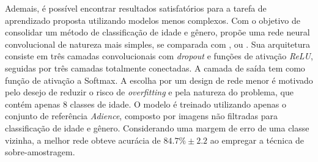 Ademais, é possível encontrar resultados satisfatórios para a tarefa de aprendizado proposta utilizando modelos menos complexos. Com o objetivo de consolidar um método de classificação de idade e gênero, \cite{levi2015age} propõe uma rede neural convolucional de natureza mais simples, se comparada com \cite{inception}, \cite{vggnet} ou \cite{resnet}. Sua arquitetura consiste em três camadas convolucionais com \emph{dropout} e funções de ativação \emph{ReLU}, seguidas por três camadas totalmente conectadas. A camada de saída tem como função de ativação a Softmax. A escolha por um design de rede menor é motivado pelo desejo de reduzir o risco de \emph{overfitting} e pela natureza do problema, que contém apenas 8 classes de idade. O modelo é treinado utilizando apenas o conjunto de referência \emph{Adience}, composto por imagens não filtradas para classificação de idade e gênero. Considerando uma margem de erro de uma classe vizinha, a melhor rede obteve acurácia de $84.7\% \pm 2.2$ ao empregar a técnica de sobre-amostragem.
